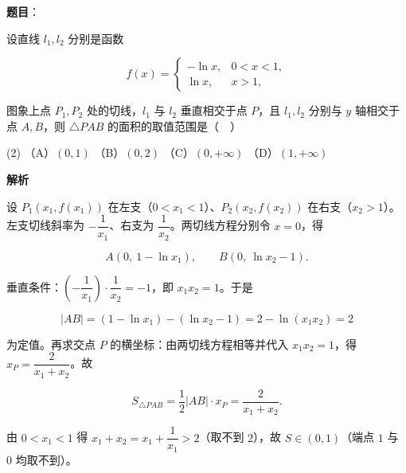 \begin{answer}

\textbf{题目}：

设直线 \(l_{1},l_{2}\) 分别是函数

\nopagebreak[4]
\[
f(x)=\begin{cases}
-\ln x, & 0<x<1,\\
\ln x, & x>1,
\end{cases}
\]

图象上点 \(P_{1},P_{2}\) 处的切线，\(l_{1}\) 与 \(l_{2}\) 垂直相交于点 \(P\)，且 \(l_{1},l_{2}\) 分别与 \(y\) 轴相交于点 \(A,B\)，则 \(\triangle PAB\) 的面积的取值范围是（　）

\begin{gkopts}(2)
\task （A）\((0,1)\)
\task （B）\((0,2)\)
\task （C）\((0,+\infty)\)
\task （D）\((1,+\infty)\)
\end{gkopts}

\textbf{解析}

设 \(P_1(x_1,f(x_1))\) 在左支（\(0<x_1<1\)）、\(P_2(x_2,f(x_2))\) 在右支（\(x_2>1\)）。左支切线斜率为 \(-\dfrac{1}{x_1}\)、右支为 \(\dfrac{1}{x_2}\)。两切线方程分别令 \(x=0\)，得

\nopagebreak[4]
\[
A(0,\ 1-\ln x_1),\qquad B(0,\ \ln x_2-1).
\]

垂直条件：\(\left(-\dfrac{1}{x_1}\right)\cdot\dfrac{1}{x_2}=-1\)，即 \(x_1x_2=1\)。于是

\nopagebreak[4]
\[
|AB|=(1-\ln x_1)-(\ln x_2-1)=2-\ln(x_1x_2)=2
\]

为定值。再求交点 \(P\) 的横坐标：由两切线方程相等并代入 \(x_1x_2=1\)，得 \(x_P=\dfrac{2}{x_1+x_2}\)。故

\nopagebreak[4]
\[
S_{\triangle PAB}=\frac{1}{2}|AB|\cdot x_P=\frac{2}{x_1+x_2}.
\]

由 \(0<x_1<1\) 得 \(x_1+x_2=x_1+\dfrac{1}{x_1}>2\)（取不到 \(2\)），故 \(S\in(0,1)\)（端点 \(1\) 与 \(0\) 均取不到）。


\end{answer}
